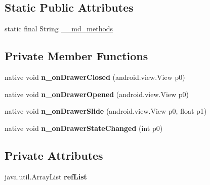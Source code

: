 \subsection*{Static Public Attributes}
\begin{DoxyCompactItemize}
\item 
static final String \hyperlink{classmono_1_1android_1_1support_1_1v4_1_1widget_1_1DrawerLayout__DrawerListenerImplementor_a7a043c89da462068f6a987eb0eaaf8f3}{\+\_\+\+\_\+md\+\_\+methods}
\end{DoxyCompactItemize}
\subsection*{Private Member Functions}
\begin{DoxyCompactItemize}
\item 
\mbox{\label{classmono_1_1android_1_1support_1_1v4_1_1widget_1_1DrawerLayout__DrawerListenerImplementor_a9fd1a5bf520a76a70147551143d68a1b}} 
native void {\bfseries n\+\_\+on\+Drawer\+Closed} (android.\+view.\+View p0)
\item 
\mbox{\label{classmono_1_1android_1_1support_1_1v4_1_1widget_1_1DrawerLayout__DrawerListenerImplementor_aa220434469e1ccdc812af11b8e0b7521}} 
native void {\bfseries n\+\_\+on\+Drawer\+Opened} (android.\+view.\+View p0)
\item 
\mbox{\label{classmono_1_1android_1_1support_1_1v4_1_1widget_1_1DrawerLayout__DrawerListenerImplementor_afce486108a7a1ee2ec48cfa07d75f871}} 
native void {\bfseries n\+\_\+on\+Drawer\+Slide} (android.\+view.\+View p0, float p1)
\item 
\mbox{\label{classmono_1_1android_1_1support_1_1v4_1_1widget_1_1DrawerLayout__DrawerListenerImplementor_a28931883934a45420c5e6be2137793a8}} 
native void {\bfseries n\+\_\+on\+Drawer\+State\+Changed} (int p0)
\end{DoxyCompactItemize}
\subsection*{Private Attributes}
\begin{DoxyCompactItemize}
\item 
\mbox{\label{classmono_1_1android_1_1support_1_1v4_1_1widget_1_1DrawerLayout__DrawerListenerImplementor_a1cf2af08cab7def400914e1842c729de}} 
java.\+util.\+Array\+List {\bfseries ref\+List}
\end{DoxyCompactItemize}


